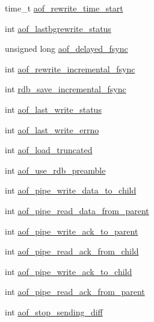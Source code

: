 \begin{DoxyCompactItemize}
\item 
time\+\_\+t \hyperlink{structredis_server_af6832f23d61ee1b6d41ec93f837aa9d5}{aof\+\_\+rewrite\+\_\+time\+\_\+start}
\item 
int \hyperlink{structredis_server_af53a8a16d14d100894cab6431a4622d9}{aof\+\_\+lastbgrewrite\+\_\+status}
\item 
unsigned long \hyperlink{structredis_server_a187b658f1e959f3f46ec5caa22b782cd}{aof\+\_\+delayed\+\_\+fsync}
\item 
int \hyperlink{structredis_server_a320d427960bbcbd74742e22bb212b30f}{aof\+\_\+rewrite\+\_\+incremental\+\_\+fsync}
\item 
int \hyperlink{structredis_server_a4db97e483512d8067f0527e75efac10b}{rdb\+\_\+save\+\_\+incremental\+\_\+fsync}
\item 
int \hyperlink{structredis_server_aa67a20f0faa8ffcc2abcb42b15d4b3d0}{aof\+\_\+last\+\_\+write\+\_\+status}
\item 
int \hyperlink{structredis_server_ad47f78d56e1b3866a1a31c4389fc753e}{aof\+\_\+last\+\_\+write\+\_\+errno}
\item 
int \hyperlink{structredis_server_af5cd250e4dc688a3d3db7ea6844efb8c}{aof\+\_\+load\+\_\+truncated}
\item 
int \hyperlink{structredis_server_a0c953f8b0a592e40db65c5af748d7974}{aof\+\_\+use\+\_\+rdb\+\_\+preamble}
\item 
int \hyperlink{structredis_server_a299e5a9a69eab6c960a258a9de896b76}{aof\+\_\+pipe\+\_\+write\+\_\+data\+\_\+to\+\_\+child}
\item 
int \hyperlink{structredis_server_a1ed00bc25515fa8d081baae93961047f}{aof\+\_\+pipe\+\_\+read\+\_\+data\+\_\+from\+\_\+parent}
\item 
int \hyperlink{structredis_server_a4301e8d7b571c3283e84825c2ac134e0}{aof\+\_\+pipe\+\_\+write\+\_\+ack\+\_\+to\+\_\+parent}
\item 
int \hyperlink{structredis_server_aced8d616b224cec8494fdd4ab142d362}{aof\+\_\+pipe\+\_\+read\+\_\+ack\+\_\+from\+\_\+child}
\item 
int \hyperlink{structredis_server_ae56cf8c0c9ebeaf2d0e69ed6f21e3215}{aof\+\_\+pipe\+\_\+write\+\_\+ack\+\_\+to\+\_\+child}
\item 
int \hyperlink{structredis_server_afeb80641524799eca963181e6df6d266}{aof\+\_\+pipe\+\_\+read\+\_\+ack\+\_\+from\+\_\+parent}
\item 
int \hyperlink{structredis_server_a777db759da5a87abb48602c83140f20e}{aof\+\_\+stop\+\_\+sending\+\_\+diff}
\item 

\end{DoxyCompactItemize}
